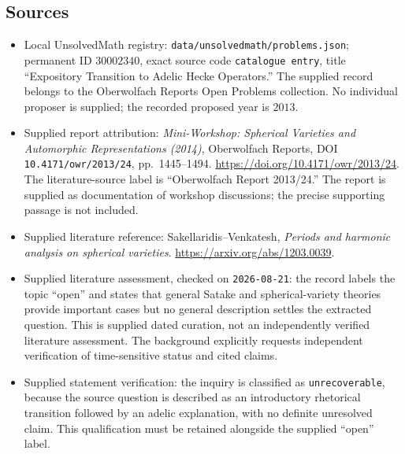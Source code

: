 \documentclass[11pt]{article}
\begin{document}
\subsection{Sources}
\begin{itemize}
\item Local UnsolvedMath registry: \texttt{data/unsolvedmath/problems.json}; permanent ID \(30002340\), exact source code \texttt{catalogue entry}, title ``Expository Transition to Adelic Hecke Operators.'' The supplied record belongs to the Oberwolfach Reports Open Problems collection. No individual proposer is supplied; the recorded proposed year is \(2013\).
\item Supplied report attribution: \emph{Mini-Workshop: Spherical Varieties and Automorphic Representations (2014)}, Oberwolfach Reports, DOI \texttt{10.4171/owr/2013/24}, pp.~1445--1494. \url{https://doi.org/10.4171/owr/2013/24}. The literature-source label is ``Oberwolfach Report 2013/24.'' The report is supplied as documentation of workshop discussions; the precise supporting passage is not included.
\item Supplied literature reference: Sakellaridis--Venkatesh, \emph{Periods and harmonic analysis on spherical varieties}. \url{https://arxiv.org/abs/1203.0039}.
\item Supplied literature assessment, checked on \texttt{2026-08-21}: the record labels the topic ``open'' and states that general Satake and spherical-variety theories provide important cases but no general description settles the extracted question. This is supplied dated curation, not an independently verified literature assessment. The background explicitly requests independent verification of time-sensitive status and cited claims.
\item Supplied statement verification: the inquiry is classified as \texttt{unrecoverable}, because the source question is described as an introductory rhetorical transition followed by an adelic explanation, with no definite unresolved claim. This qualification must be retained alongside the supplied ``open'' label.
\end{itemize}
\end{document}

